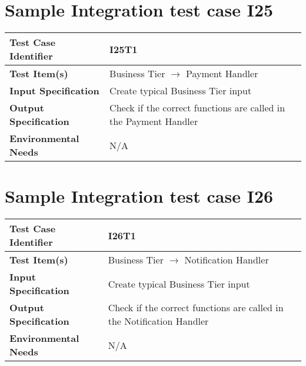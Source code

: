 \section{Sample Integration test case I25}\label{I25}
\begin{center}
	\vspace{0.6cm}
	\begin{tabular}{|l|l|}
		\hline
		\textbf{Test Case Identifier} & I25T1 \bigstrut \\\hline
		\textbf{Test Item(s)} & Business Tier \ensuremath{\rightarrow} Payment Handler \bigstrut \\\hline
		\textbf{Input Specification} & Create typical Business Tier input \bigstrut \\\hline
		\textbf{Output Specification} & Check if the correct functions are called in the Payment Handler \bigstrut \\\hline
		\textbf{Environmental Needs} & N/A \bigstrut \\\hline
	\end{tabular}
\end{center}

\section{Sample Integration test case I26}\label{I26}
\begin{center}
	\vspace{0.6cm}
	\begin{tabular}{|l|l|}
		\hline
		\textbf{Test Case Identifier} & I26T1 \bigstrut \\\hline
		\textbf{Test Item(s)} & Business Tier \ensuremath{\rightarrow} Notification Handler \bigstrut \\\hline
		\textbf{Input Specification} & Create typical Business Tier input \bigstrut \\\hline
		\textbf{Output Specification} & Check if the correct functions are called in the Notification Handler \bigstrut \\\hline
		\textbf{Environmental Needs} & N/A \bigstrut \\\hline
	\end{tabular}
\end{center}


